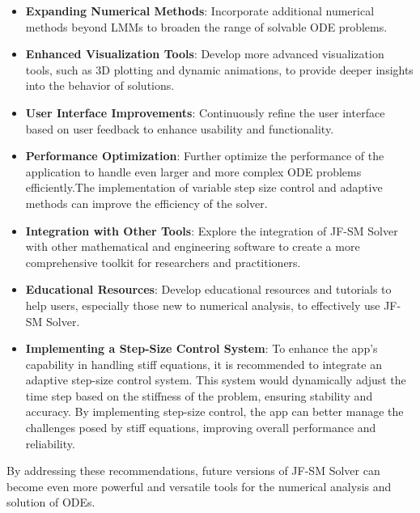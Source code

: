 \begin{itemize}
  \item \textbf{Expanding Numerical Methods}: Incorporate additional numerical methods beyond LMMs to broaden the range of solvable ODE problems.
  \item \textbf{Enhanced Visualization Tools}: Develop more advanced visualization tools, such as 3D plotting and dynamic animations, to provide deeper insights into the behavior of solutions.
  \item \textbf{User Interface Improvements}: Continuously refine the user interface based on user feedback to enhance usability and functionality.
  
  \item \textbf{Performance Optimization}: Further optimize the performance of the application to handle even larger and more complex ODE problems efficiently.The implementation of variable step size control and adaptive methods can improve the efficiency of the solver.
  \item \textbf{Integration with Other Tools}: Explore the integration of JF-SM Solver with other mathematical and engineering software to create a more comprehensive toolkit for researchers and practitioners.
  \item \textbf{Educational Resources}: Develop educational resources and tutorials to help users, especially those new to numerical analysis, to effectively use JF-SM Solver.
  \item \textbf{Implementing a Step-Size Control System}: To enhance the app's capability in handling stiff equations, it is recommended to integrate an adaptive step-size control system. This system would dynamically adjust the time step based on the stiffness of the problem, ensuring stability and accuracy. By implementing step-size control, the app can better manage the challenges posed by stiff equations, improving overall performance and reliability.
\end{itemize}

By addressing these recommendations, future versions of JF-SM Solver can become even more powerful and versatile tools for the numerical analysis and solution of ODEs.
